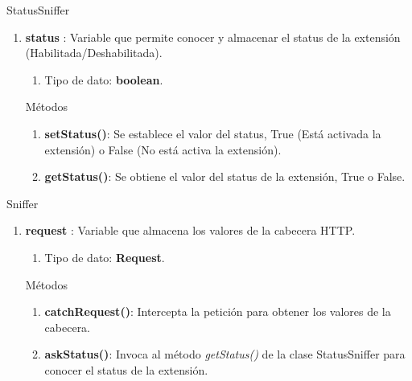 \documentclass[12pt, a4paper, titlepage]{report}
\begin{document}
			    StatusSniffer
			    \begin{enumerate}
    		        \item \textbf{status} : Variable que permite conocer y almacenar el status de la extensión (Habilitada/Deshabilitada).
    		        \begin{enumerate}
    		            \item Tipo de dato: \textbf{boolean}.
    		        \end{enumerate}
    		        Métodos
    		        \begin{enumerate}
    		            \item \textbf{setStatus()}: Se establece el valor del status, True (Está activada la extensión) o False (No está activa la extensión).
    		            \item \textbf{getStatus()}: Se obtiene el valor del status de la extensión, True o False.
    		        \end{enumerate}
			    \end{enumerate}
		        
	            Sniffer
			    \begin{enumerate}
    		        \item \textbf{request} : Variable que almacena los valores de la cabecera HTTP.
    		        \begin{enumerate}
    		            \item Tipo de dato: \textbf{Request}.
    		        \end{enumerate}
    		        Métodos
    		        \begin{enumerate}
    		            \item \textbf{catchRequest()}: Intercepta la petición para obtener los valores de la cabecera.
    		            \item \textbf{askStatus()}: Invoca al método \textit{getStatus()} de la clase StatusSniffer para conocer el status de la extensión.
    		        \end{enumerate}
			    \end{enumerate}
			    
\end{document}
